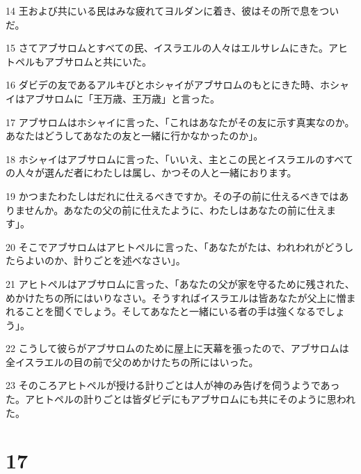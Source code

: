 \par 14 王および共にいる民はみな疲れてヨルダンに着き、彼はその所で息をついだ。
\par 15 さてアブサロムとすべての民、イスラエルの人々はエルサレムにきた。アヒトペルもアブサロムと共にいた。
\par 16 ダビデの友であるアルキびとホシャイがアブサロムのもとにきた時、ホシャイはアブサロムに「王万歳、王万歳」と言った。
\par 17 アブサロムはホシャイに言った、「これはあなたがその友に示す真実なのか。あなたはどうしてあなたの友と一緒に行かなかったのか」。
\par 18 ホシャイはアブサロムに言った、「いいえ、主とこの民とイスラエルのすべての人々が選んだ者にわたしは属し、かつその人と一緒におります。
\par 19 かつまたわたしはだれに仕えるべきですか。その子の前に仕えるべきではありませんか。あなたの父の前に仕えたように、わたしはあなたの前に仕えます」。
\par 20 そこでアブサロムはアヒトペルに言った、「あなたがたは、われわれがどうしたらよいのか、計りごとを述べなさい」。
\par 21 アヒトペルはアブサロムに言った、「あなたの父が家を守るために残された、めかけたちの所にはいりなさい。そうすればイスラエルは皆あなたが父上に憎まれることを聞くでしょう。そしてあなたと一緒にいる者の手は強くなるでしょう」。
\par 22 こうして彼らがアブサロムのために屋上に天幕を張ったので、アブサロムは全イスラエルの目の前で父のめかけたちの所にはいった。
\par 23 そのころアヒトペルが授ける計りごとは人が神のみ告げを伺うようであった。アヒトペルの計りごとは皆ダビデにもアブサロムにも共にそのように思われた。

\chapter{17}

